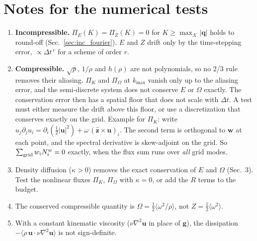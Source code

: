 \documentclass[11pt]{article}
\newcommand{\avg}[1]{\langle #1\rangle}
\begin{document}
\section{Notes for the numerical tests}

\begin{enumerate}
\item \textbf{Incompressible.} $\Pi_E(K)=\Pi_Z(K)=0$ for $K\ge\max_{\mathcal K}|\bm q|$ holds to round-off (Sec.~\ref{sec:inc_fourier}).
$E$ and $Z$ drift only by the time-stepping error, $\propto\Delta t^{\,r}$ for a scheme of order $r$.
\item \textbf{Compressible.} $\sqrt\rho$, $1/\rho$ and $h(\rho)$ are not polynomials, so no 2/3 rule removes their aliasing.
$\Pi_K$ and $\Pi_\Omega$ at $k_{\max}$ vanish only up to the aliasing error, and the semi-discrete system does not conserve $E$ or $\Omega$ exactly.
The conservation error then has a spatial floor that does not scale with $\Delta t$.
A test must either measure the drift above this floor, or use a discretization that conserves exactly on the grid.
Example for $\Pi_K$: write $u_j\partial_ju_i=\partial_i(\tfrac12|\bm u|^2)+\omega\,(\hat{\bm z}\times\bm u)_i$.
The second term is orthogonal to $\bm w$ at each point, and the spectral derivative is skew-adjoint on the grid.
So $\sum_{\rm grid}w_iN^w_i=0$ exactly, when the flux sum runs over \emph{all} grid modes.
\item Density diffusion ($\kappa>0$) removes the exact conservation of $E$ and $\Omega$ (Sec.~3). Test the nonlinear fluxes $\Pi_K$, $\Pi_\Omega$ with $\kappa=0$, or add the $R$ terms to the budget.
\item The conserved compressible quantity is $\Omega=\tfrac12\avg{\omega^2/\rho}$, not $Z=\tfrac12\avg{\omega^2}$.
\item With a constant kinematic viscosity ($\nu\nabla^2\bm u$ in place of $\bm g$), the dissipation $-\avg{\rho\,\bm u\cdot\nu\nabla^2\bm u}$ is not sign-definite.
\end{enumerate}
\end{document}
